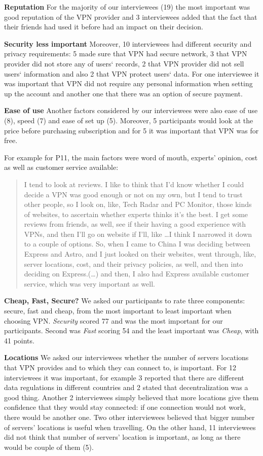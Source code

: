\textbf{Reputation} For the majority of our interviewees (19) the most
important was good reputation of the VPN provider and 3 interviewees added
that the fact that their friends had used it before had an impact on their
decision. 

\textbf{Security less important} Moreover, 10 interviewees had different
security and privacy requirements: 5 made sure that VPN had secure network, 3
that VPN provider did not store any of users‘ records, 2 that VPN provider did
not sell users‘ information and also 2 that VPN protect users‘ data. For one
interviewee it was important that VPN did not require any personal information
when setting up the account and another one that there was an option of secure
payment. 

\textbf{Ease of use} Another factors considered by our interviewees were also
ease of use (8), speed (7) and ease of set up (5). Moreover, 5 participants
would look at the price before purchasing subscription and for 5 it was
important that VPN was for free.   

For example for P11, the main factors were word of mouth, experts’ opinion,
cost as well as customer service available: \begin{quote}I tend to look at
    reviews. I like to think that I'd know whether I could decide a VPN was
    good enough or not on my own, but I tend to trust other people, so I look
    on, like, Tech Radar and PC Monitor, those kinds of websites, to ascertain
    whether experts thinks it's the best. I get some reviews from friends, as
    well, see if their having a good experience with VPNs, and then I'll go on
    website if I'll, like \dots I think I narrowed it down to a couple of
    options. So, when I came to China I was deciding between Express and
    Astro, and I just looked on their websites, went through, like, server
    locations, cost, and their privacy policies, as well, and then into
    deciding on Express.(\dots) and then, I also had Express available
customer service, which was very important as well.\end{quote}

\textbf{Cheap, Fast, Secure?} We asked our participants to rate three
components: secure, fast and cheap, from the most important to least important
when choosing VPN. \textit{Security} scored 77 and was the most important for
our participants. Second was \textit{Fast} scoring 54 and the least important
was \textit{Cheap}, with 41 points.


\textbf{Locations} We asked our interviewees whether the number of servers
locations that VPN provides and to which they can connect to, is important.
For 12 interviewees it was important, for example 3 reported that there are
different data regulations in different countries and 2 stated that
decentralization was a good thing. Another 2 interviewees simply believed that
more locations give them confidence that they would stay connected: if one
connection would not work, there would be another one. Two other interviewees
believed that bigger number of servers’ locations is useful when travelling.
On the other hand, 11 interviewees did not think that number of servers’
location is important, as long as there would be couple of them (5).  

